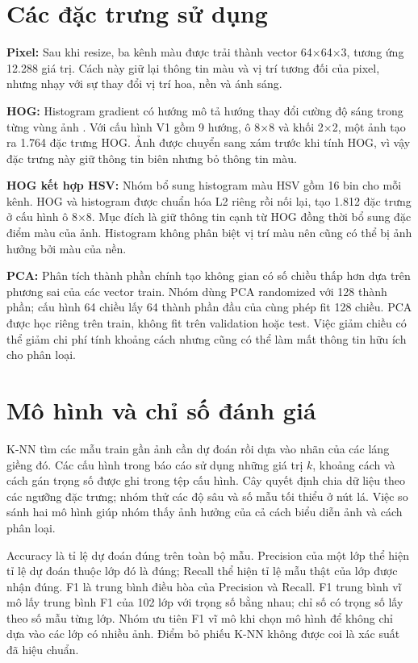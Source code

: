\section{Các đặc trưng sử dụng}
\textbf{Pixel:} Sau khi resize, ba kênh màu được trải thành vector 64×64×3, tương ứng 12.288 giá trị. Cách này giữ lại thông tin màu và vị trí tương đối của pixel, nhưng nhạy với sự thay đổi vị trí hoa, nền và ánh sáng.

\textbf{HOG:} Histogram gradient có hướng mô tả hướng thay đổi cường độ sáng trong từng vùng ảnh \cite{hog}. Với cấu hình V1 gồm 9 hướng, ô 8×8 và khối 2×2, một ảnh tạo ra 1.764 đặc trưng HOG. Ảnh được chuyển sang xám trước khi tính HOG, vì vậy đặc trưng này giữ thông tin biên nhưng bỏ thông tin màu.

\textbf{HOG kết hợp HSV:} Nhóm bổ sung histogram màu HSV gồm 16 bin cho mỗi kênh. HOG và histogram được chuẩn hóa L2 riêng rồi nối lại, tạo 1.812 đặc trưng ở cấu hình ô 8×8. Mục đích là giữ thông tin cạnh từ HOG đồng thời bổ sung đặc điểm màu của ảnh. Histogram không phân biệt vị trí màu nên cũng có thể bị ảnh hưởng bởi màu của nền.

\textbf{PCA:} Phân tích thành phần chính tạo không gian có số chiều thấp hơn dựa trên phương sai của các vector train. Nhóm dùng PCA randomized với 128 thành phần; cấu hình 64 chiều lấy 64 thành phần đầu của cùng phép fit 128 chiều. PCA được học riêng trên train, không fit trên validation hoặc test. Việc giảm chiều có thể giảm chi phí tính khoảng cách nhưng cũng có thể làm mất thông tin hữu ích cho phân loại.
\section{Mô hình và chỉ số đánh giá}
K-NN tìm các mẫu train gần ảnh cần dự đoán rồi dựa vào nhãn của các láng giềng đó. Các cấu hình trong báo cáo sử dụng những giá trị $k$, khoảng cách và cách gán trọng số được ghi trong tệp cấu hình. Cây quyết định chia dữ liệu theo các ngưỡng đặc trưng; nhóm thử các độ sâu và số mẫu tối thiểu ở nút lá. Việc so sánh hai mô hình giúp nhóm thấy ảnh hưởng của cả cách biểu diễn ảnh và cách phân loại.

Accuracy là tỉ lệ dự đoán đúng trên toàn bộ mẫu. Precision của một lớp thể hiện tỉ lệ dự đoán thuộc lớp đó là đúng; Recall thể hiện tỉ lệ mẫu thật của lớp được nhận đúng. F1 là trung bình điều hòa của Precision và Recall. F1 trung bình vĩ mô lấy trung bình F1 của 102 lớp với trọng số bằng nhau; chỉ số có trọng số lấy theo số mẫu từng lớp. Nhóm ưu tiên F1 vĩ mô khi chọn mô hình để không chỉ dựa vào các lớp có nhiều ảnh. Điểm bỏ phiếu K-NN không được coi là xác suất đã hiệu chuẩn.
